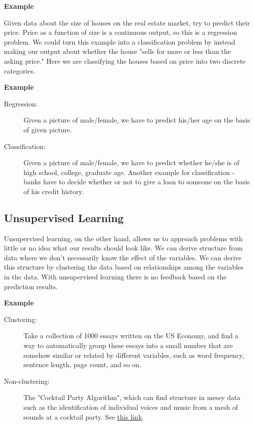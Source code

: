 \documentclass[a4paper,11pt]{report}
\begin{document}
\textbf{Example}

Given data about the size of houses on the real estate market, try to predict their price. Price as a function of size is a continuous output, so this is a regression problem.
We could turn this example into a classification problem by instead making our output about whether the house "sells for more or less than the asking price." Here we are classifying the houses based on price into two discrete categories.

\newpage

\textbf{Example}
\begin{description}
 \item [Regression:] Given a picture of male/female, we have to predict his/her age on the basis of given picture.
 \item [Classification:] Given a picture of male/female, we have to predict whether he/she is of high school, college, graduate age. Another example for classification - banks have to decide whether or not to give a loan to someone on the basis of his credit history.
\end{description}

\subsection*{Unsupervised Learning}

Unsupervised learning, on the other hand, allows us to approach problems with little or no idea what our results should look like. We can derive structure from data where we don't necessarily know the effect of the variables. We can derive this structure by clustering the data based on relationships among the variables in the data. With unsupervised learning there is no feedback based on the prediction results.

\textbf{Example}
\begin{description}
\item[Clustering:] Take a collection of 1000 essays written on the US Economy, and find a way to automatically group these essays into a small number that are somehow similar or related by different variables, such as word frequency, sentence length, page count, and so on.
\item[Non-clustering:] The "Cocktail Party Algorithm", which can find structure in messy data such as the identification of individual voices and music from a mesh of sounds at a cocktail party. See \href{https://en.wikipedia.org/wiki/Cocktail_party_effect}{this link}.
\end{description}
\end{document}
